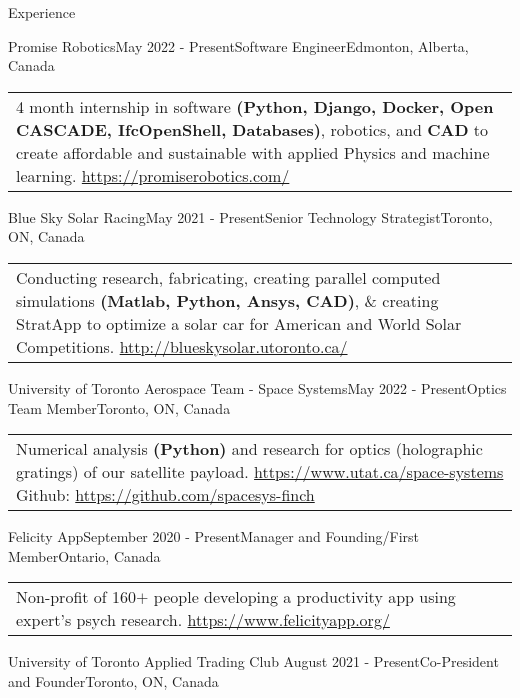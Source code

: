 \documentclass[UTF8]{resume} %
\begin{document}
\begin{rSection}{Experience}
\begin{rSubsection}{Promise Robotics}{May 2022 - Present}{Software Engineer}{Edmonton, Alberta, Canada}
    \begin{tabular}{p{15cm}}
        \scriptsize{4 month internship in software \textbf{(Python, Django, Docker, Open CASCADE, IfcOpenShell, Databases)}, robotics, and \textbf{CAD} to create affordable and sustainable with applied Physics and machine learning.  \href{https://promiserobotics.com/}{https://promiserobotics.com/}}
    \end{tabular}
\end{rSubsection}
\begin{rSubsection}{Blue Sky Solar Racing}{May 2021 - Present}{Senior Technology Strategist}{Toronto, ON, Canada}
    \begin{tabular}{p{15cm}}
        \scriptsize{Conducting research, fabricating, creating parallel computed simulations \textbf{(Matlab, Python, Ansys, CAD)}, \& creating StratApp to optimize a solar car for American and World Solar Competitions.  \href{http://blueskysolar.utoronto.ca/}{http://blueskysolar.utoronto.ca/}}
    \end{tabular}
\end{rSubsection}
\begin{rSubsection}{University of Toronto Aerospace Team - Space Systems}{May 2022 - Present}{Optics Team Member}{Toronto, ON, Canada}
    \begin{tabular}{p{15cm}}
        \scriptsize{Numerical analysis \textbf{(Python)} and research for optics (holographic gratings) of our satellite payload. \href{https://www.utat.ca/space-systems}{https://www.utat.ca/space-systems}} Github: \href{https://github.com/spacesys-finch}{https://github.com/spacesys-finch}
    \end{tabular}
\end{rSubsection}
\begin{rSubsection}{Felicity App}{September 2020 - Present}{Manager and Founding/First Member}{Ontario, Canada}
\begin{tabular}{p{15cm}}
\scriptsize{Non-profit of 160\(+\) people developing a productivity app using expert's psych research. \href{https://www.felicityapp.org/}{https://www.felicityapp.org/}}
\end{tabular}
\end{rSubsection}
\begin{rSubsection}{University of Toronto Applied Trading Club }{August 2021 - Present}{Co-President and Founder}{Toronto, ON, Canada}

\end{rSubsection}
\end{rSection}
\end{document}
